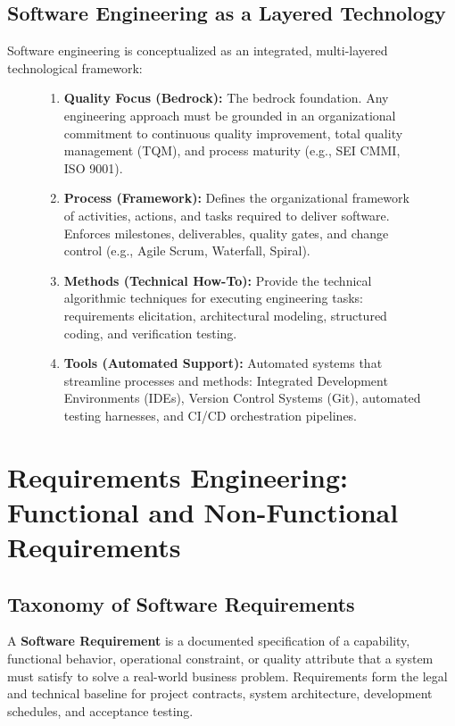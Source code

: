 \subsection{Software Engineering as a Layered Technology}
Software engineering is conceptualized as an integrated, multi-layered technological framework:
\begin{figure}[htbp]
\centering
\begin{tcolorbox}[colback=codebg, colframe=primary, title=\textbf{The Four Layers of Software Engineering}]
\begin{enumerate}
    \item \textbf{Quality Focus (Bedrock):} The bedrock foundation. Any engineering approach must be grounded in an organizational commitment to continuous quality improvement, total quality management (TQM), and process maturity (e.g., SEI CMMI, ISO 9001).
    \item \textbf{Process (Framework):} Defines the organizational framework of activities, actions, and tasks required to deliver software. Enforces milestones, deliverables, quality gates, and change control (e.g., Agile Scrum, Waterfall, Spiral).
    \item \textbf{Methods (Technical How-To):} Provide the technical algorithmic techniques for executing engineering tasks: requirements elicitation, architectural modeling, structured coding, and verification testing.
    \item \textbf{Tools (Automated Support):} Automated systems that streamline processes and methods: Integrated Development Environments (IDEs), Version Control Systems (Git), automated testing harnesses, and CI/CD orchestration pipelines.
\end{enumerate}
\end{tcolorbox}
\end{figure}

\section{Requirements Engineering: Functional and Non-Functional Requirements}
\label{sec:se_requirements}

\subsection{Taxonomy of Software Requirements}
A \textbf{Software Requirement} is a documented specification of a capability, functional behavior, operational constraint, or quality attribute that a system must satisfy to solve a real-world business problem. Requirements form the legal and technical baseline for project contracts, system architecture, development schedules, and acceptance testing.

